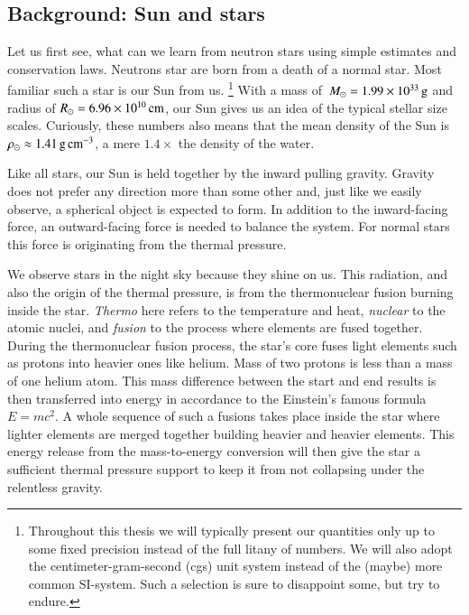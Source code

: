 \subsection{Background: Sun and stars}
Let us first see, what can we learn from neutron stars using simple estimates and conservation laws.
Neutrons star are born from a death of a normal star.%
Most familiar such a star is our Sun  \cm from us.%
\footnote{Throughout this thesis we will typically present our quantities only up to some fixed precision instead of the full litany of numbers.
We will also adopt the centimeter-gram-second (cgs) unit system instead of the (maybe) more common SI-system. 
Such a selection is sure to disappoint some, but try to endure.
}
With a mass of $\, M_{\odot} = 1.99 \times 10^{33} \, \mathrm{g}$ and radius of $R_{\odot} = 6.96 \times 10^{10} \, \mathrm{cm}$, our Sun gives us an idea of the typical stellar size scales.
Curiously, these numbers also means that the mean density of the Sun is $\rho_{\odot} \approx 1.41 \, \mathrm{g}\,\mathrm{cm}^{-3} $, a mere $1.4\times$ the density of the water.

Like all stars, our Sun is held together by the inward pulling gravity.
Gravity does not prefer any direction more than some other and, just like we easily observe, a spherical object is expected to form.
In addition to the inward-facing force, an outward-facing force is needed to balance the system.
For normal stars this force is originating from the thermal pressure.

We observe stars in the night sky because they shine on us.%
This radiation, and also the origin of the thermal pressure, is from the thermonuclear fusion burning inside the star.
\textit{Thermo} here refers to the temperature and heat, \textit{nuclear} to the atomic nuclei, and \textit{fusion} to the process where elements are fused together.
During the thermonuclear fusion process, the star's core fuses light elements such as protons into heavier ones like helium.
Mass of two protons is less than a mass of one helium atom.
This mass difference between the start and end results is then transferred into energy in accordance to the Einstein's famous formula $E = mc^2$.
A whole sequence of such a fusions takes place inside the star where lighter elements are merged together building heavier and heavier elements.
This energy release from the mass-to-energy conversion will then give the star a sufficient thermal pressure support to keep it from not collapsing under the relentless gravity.

